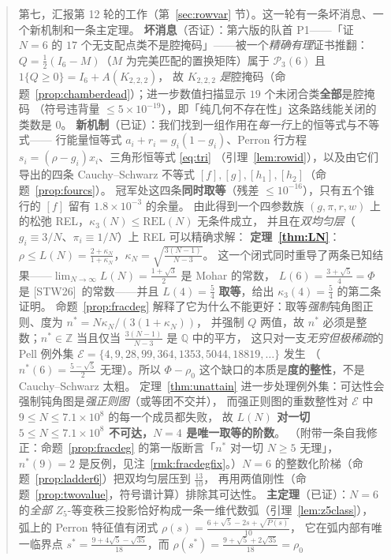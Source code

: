 \documentclass[UTF8,11pt]{ctexart}
\theoremstyle{definition}
\newcommand{\Q}{\mathbb{Q}}
\newcommand{\Z}{\mathbb{Z}}
\newcommand{\STW}{\textup{[STW26]}}
\begin{document}
\begin{abstract}
第七，汇报第 12 轮的工作（第~\ref{sec:rowvar} 节）。这一轮有一条坏消息、一个新机制和一条主定理。
\textbf{坏消息}（否证）：第六版的队首 P1——「证 $N=6$ 的 $17$ 个无支配点类不是腔掩码」——被一个\emph{精确有理}证书推翻：
$Q=\frac12(I_6-M)$（$M$ 为完美匹配的置换矩阵）属于 $\mathcal P_3(6)$ 且 $1\{Q\ge0\}=I_6+A(K_{2,2,2})$，
故 $K_{2,2,2}$ \emph{是}腔掩码（命题~\ref{prop:chamberdead}）；进一步数值扫描显示 $19$ 个未闭合类\textbf{全部}是腔掩码
（符号违背量 $\le5\times10^{-19}$），即「纯几何不存在性」这条路线能关闭的类数是 $0$。
\textbf{新机制}（已证）：我们找到一组作用在\emph{每一行}上的恒等式与不等式——
行能量恒等式 $a_i+r_i=g_i(1-g_i)$、Perron 行方程 $s_i=(\rho-g_i)x_i$、三角形恒等式 \eqref{eq:tri}
（引理~\ref{lem:rowid}），以及由它们导出的四条 Cauchy--Schwarz 不等式 $[f],[g],[h_1],[h_2]$（命题~\ref{prop:fourcs}）。
冠军处这四条\textbf{同时取等}（残差 $\le10^{-16}$），只有五个锥行的 $[f]$ 留有 $1.8\times10^{-3}$ 的余量。
由此得到一个四参数族 $(g,\pi,r,w)$ 上的松弛 REL，$\kappa_3(N)\le\mathrm{REL}(N)$ 无条件成立，
并且在\emph{双均匀层}（$g_i\equiv3/N$、$\pi_i\equiv1/N$）上 REL 可以精确求解：
\textbf{定理~\ref{thm:LN}}：$\rho\le L(N)=\frac{2+\kappa_N}{1+\kappa_N}$，$\kappa_N=\sqrt{\frac{3(N-1)}{N-3}}$。
这一个闭式同时重导了两条已知结果——$\lim_{N\to\infty}L(N)=\frac{1+\sqrt3}2$ 是 Mohar 的常数，
$L(6)=\frac{3+\sqrt5}4=\Phi$ 是 \STW\ 的常数——并且 $L(4)=\frac54$ \textbf{取等}，给出 $\kappa_3(4)=\frac54$ 的第二条证明。
命题~\ref{prop:fracdeg} 解释了它为什么不能更好：取等\emph{强制}钝角图正则、度为 $n^*=N\kappa_N/(3(1+\kappa_N))$，
并强制 $Q$ 两值，故 $n^*$ 必须是整数；$n^*\in\Z$ 当且仅当 $\frac{3(N-1)}{N-3}$ 是 $\Q$ 中的平方，
这只对一支\emph{无穷但极稀疏}的 Pell 例外集 $\mathcal E=\{4,9,28,99,364,1353,5044,18819,\dots\}$ 发生
（$n^*(6)=\frac{5-\sqrt5}2$ 无理）。所以 $\Phi-\rho_0$ 这个缺口的本质是\textbf{度的整性}，不是 Cauchy--Schwarz 太粗。
定理~\ref{thm:unattain} 进一步处理例外集：可达性会强制钝角图是\emph{强正则图}（或等团不交并），
而强正则图的重数整性对 $\mathcal E$ 中 $9\le N\le7.1\times10^8$ 的每一个成员都失败，
故 \textbf{$L(N)$ 对一切 $5\le N\le7.1\times10^8$ 不可达，$N=4$ 是唯一取等的阶数}。
（附带一条自我修正：命题~\ref{prop:fracdeg} 的第一版断言「$n^*$ 对一切 $N\ge5$ 无理」，
$n^*(9)=2$ 是反例，见注~\ref{rmk:fracdegfix}。）$N=6$ 的整数化阶梯（命题~\ref{prop:ladder6}）把双均匀层压到 $\frac{13}{10}$，
再用两值刚性（命题~\ref{prop:twovalue}，符号谱计算）排除其可达性。
\textbf{主定理}（已证）：$N=6$ 的\emph{全部} $Z_5$-等变秩三投影恰好构成一条一维代数弧（引理~\ref{lem:z5class}），
弧上的 Perron 特征值有闭式 $\rho(s)=\frac{6+\sqrt5-2s+\sqrt{P(s)}}{10}$，
它在弧内部有唯一临界点 $s^*=\frac{9+4\sqrt5-\sqrt{35}}{18}$，而 $\rho(s^*)=\frac{9+\sqrt5+2\sqrt{35}}{18}=\rho_0$

\end{abstract}
\end{document}
